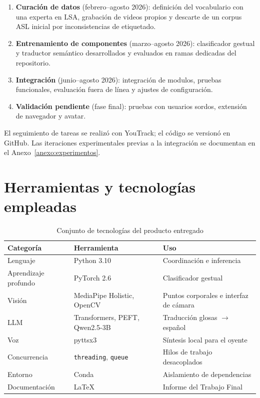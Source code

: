 \documentclass[12pt,a4paper]{report}
\begin{document}
\begin{enumerate}
    \item \textbf{Curación de datos} (febrero--agosto 2026): definición del vocabulario con una experta en LSA, grabación de videos propios y descarte de un corpus ASL inicial por inconsistencias de etiquetado.
    \item \textbf{Entrenamiento de componentes} (marzo--agosto 2026): clasificador gestual y traductor semántico desarrollados y evaluados en ramas dedicadas del repositorio.
    \item \textbf{Integración} (junio--agosto 2026): integración de modulos, pruebas funcionales, evaluación fuera de línea y ajustes de configuración.
    \item \textbf{Validación pendiente} (fase final): pruebas con usuarios sordos, extensión de navegador y avatar.
\end{enumerate}

El seguimiento de tareas se realizó con YouTrack; el código se versionó en GitHub. Las iteraciones experimentales previas a la integración se documentan en el Anexo~\ref{anexo:experimentos}.

\section{Herramientas y tecnologías empleadas}
\begin{table}[H]
\centering
\caption{Conjunto de tecnologías del producto entregado}
\label{tab:stack}
\begin{tabular}{@{}llp{7cm}@{}}
\toprule
\textbf{Categoría} & \textbf{Herramienta} & \textbf{Uso} \\
\midrule
Lenguaje & Python 3.10 & Coordinación e inferencia \\
Aprendizaje profundo & PyTorch 2.6 & Clasificador gestual \\
Visión & MediaPipe Holistic, OpenCV & Puntos corporales e interfaz de cámara \\
LLM & Transformers, PEFT, Qwen2.5-3B & Traducción glosas $\rightarrow$ español \\
Voz & pyttsx3 & Síntesis local para el oyente \\
Concurrencia & \texttt{threading}, \texttt{queue} & Hilos de trabajo desacoplados \\
Entorno & Conda & Aislamiento de dependencias \\
Documentación & \LaTeX{} & Informe del Trabajo Final \\
\bottomrule
\end{tabular}
\end{table}
\end{document}
